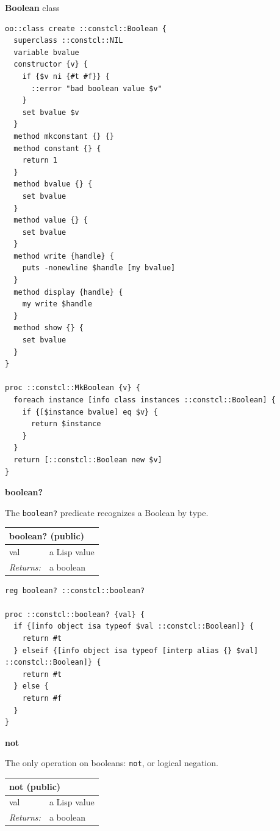\documentclass[twoside,9pt]{report}
\begin{document}
\textbf{Boolean} class

\noindent\makebox[\linewidth]{\rule{\linewidth}{0.4pt}}
\begin{lstlisting}
oo::class create ::constcl::Boolean {
  superclass ::constcl::NIL
  variable bvalue
  constructor {v} {
    if {$v ni {#t #f}} {
      ::error "bad boolean value $v"
    }
    set bvalue $v
  }
  method mkconstant {} {}
  method constant {} {
    return 1
  }
  method bvalue {} {
    set bvalue
  }
  method value {} {
    set bvalue
  }
  method write {handle} {
    puts -nonewline $handle [my bvalue]
  }
  method display {handle} {
    my write $handle
  }
  method show {} {
    set bvalue
  }
}
 
proc ::constcl::MkBoolean {v} {
  foreach instance [info class instances ::constcl::Boolean] {
    if {[$instance bvalue] eq $v} {
      return $instance
    }
  }
  return [::constcl::Boolean new $v]
}
\end{lstlisting}
\noindent\makebox[\linewidth]{\rule{\linewidth}{0.4pt}}

\textbf{boolean?}


The \texttt{boolean?} predicate recognizes a Boolean by type.

\begin{tabular}{ |l l| }
\hline
\multicolumn{2}{|l|}{boolean? (public)} \\
\hline
val & a Lisp value \\
\textit{Returns:} & a boolean \\
\hline
\end{tabular}

\noindent\makebox[\linewidth]{\rule{\linewidth}{0.4pt}}
\begin{lstlisting}
reg boolean? ::constcl::boolean?
 
proc ::constcl::boolean? {val} {
  if {[info object isa typeof $val ::constcl::Boolean]} {
    return #t
  } elseif {[info object isa typeof [interp alias {} $val] ::constcl::Boolean]} {
    return #t
  } else {
    return #f
  }
}
\end{lstlisting}
\noindent\makebox[\linewidth]{\rule{\linewidth}{0.4pt}}

\textbf{not}


The only operation on booleans: \texttt{not}, or logical negation.

\begin{tabular}{ |l l| }
\hline
\multicolumn{2}{|l|}{not (public)} \\
\hline
val & a Lisp value \\
\textit{Returns:} & a boolean \\
\hline
\end{tabular}
\end{document}
